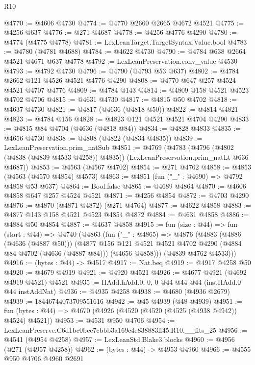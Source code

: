 \begin{lexlean}{R10}
\begin{coremodule}
@4770 := @4606 @4730
@4774 := @4770 @2660 @2665 @4672 @4521
@4775 := @4256 @637
@4776 := @271 @4687
@4778 := @4256 @4776 @4290
@4780 := @4774 (@4775 @4778)
@4781 := LexLeanTarget.TargetSyntax.Value.bool
@4783 := @4780 (@4781 @4688)
@4784 := @4622 @4730
@4790 := @4784 @638 @2664 @4521 @4671 @637 @4778
@4792 := LexLeanPreservation.conv_value @4530
@4793 := @4792 @4730
@4796 := @4790 (@4793 @53 @637)
@4802 := @4784 @2662 @121 @4526 @4521 @4776 @4290
@4808 := @4770 @647 @257 @4524 @4521 @4707 @4776
@4809 := @4784 @143
@4814 := @4809 @158 @4521 @4523 @4702 @4706
@4815 := @4631 @4730
@4817 := @4815 @50 @4702
@4818 := @4637 @4730
@4821 := @4817 (@4636 (@4818 @50))
@4822 := @4814 @4821
@4823 := @4784 @156
@4828 := @4823 @121 @4521 @4521 @4704 @4290
@4833 := @4815 @84 @4704 (@4636 (@4818 @84))
@4834 := @4828 @4833
@4835 := @4656 @4730
@4838 := @4808 (@4822 (@4834 @4835))
@4839 := LexLeanPreservation.prim_natSub
@4851 := @4769
    (@4783
      (@4796 (@4802 (@4838 (@4839 @4533 @4258)) @4835))
      (LexLeanPreservation.prim_natLt @636 @4687))
@4853 := @4563 (@4567 @4702)
@4854 := @271 @4762
@4858 := @4853 (@4563 (@4570 @4854) @4573)
@4863 := @4851 (fun ("_" : @4690) => @4792 @4858 @53 @637)
@4864 := Bool.false
@4865 := @4689 @4864
@4870 := @4606 @4858 @647 @257 @4524 @4521
@4871 := @4256 @4854
@4872 := @4703 @4290
@4876 := @4870 (@4871 @4872) (@271 @4764)
@4877 := @4622 @4858
@4883 := @4877 @143 @158 @4521 @4523 @4854 @4872
@4884 := @4631 @4858
@4886 := @4884 @50 @4854
@4887 := @4637 @4858
@4915 := fun (size : @44) =>
  fun (start : @44) =>
  @4740
    (@4863
      (fun ("_" : @4865) =>
      @4876
        (@4883
          (@4886 (@4636 (@4887 @50)))
          (@4877
            @156
            @121
            @4521
            @4521
            @4702
            @4290
            (@4884 @84 @4702 (@4636 (@4887 @84)))
            (@4656 @4858)))
        (@4839 @4762 @4533)))
@4916 := (bytes : @44) -> @4517
@4917 := Nat.beq
@4919 := @4917 @4258 @50
@4920 := @4679 @4919
@4921 := @4920 @4521
@4926 := @4677 @4921 (@4692 @4919 @4521) @4521
@4935 := HAdd.hAdd.{0, 0, 0} @44 @44 @44 (instHAdd.{0} @44 instAddNat)
@4936 := @4935 @4258
@4938 := @4680 (@4936 @2679)
@4939 := 18446744073709551616
@4942 := @45 @4939 (@48 @4939)
@4951 := fun (bytes : @44) => @4670 (@4926 (@4520 (@4520 (@4525 (@4938 @4942)) @4524) @4521))
@4953 := @4531 @950 @4706
@4954 := LexLeanPreserve.C6d1bc0bcc7cbbb3a169c4e838883ff45.R10.__fits_25
@4956 := @4541 (@4954 @4258)
@4957 := LexLeanStd.Blake3.blocks
@4960 := @4956 (@271 (@4957 @4258))
@4962 := (bytes : @44) -> @4953 @4960
@4966 := @4555 @950 @4706 @4960 @2691

\end{coremodule}
\end{lexlean}
